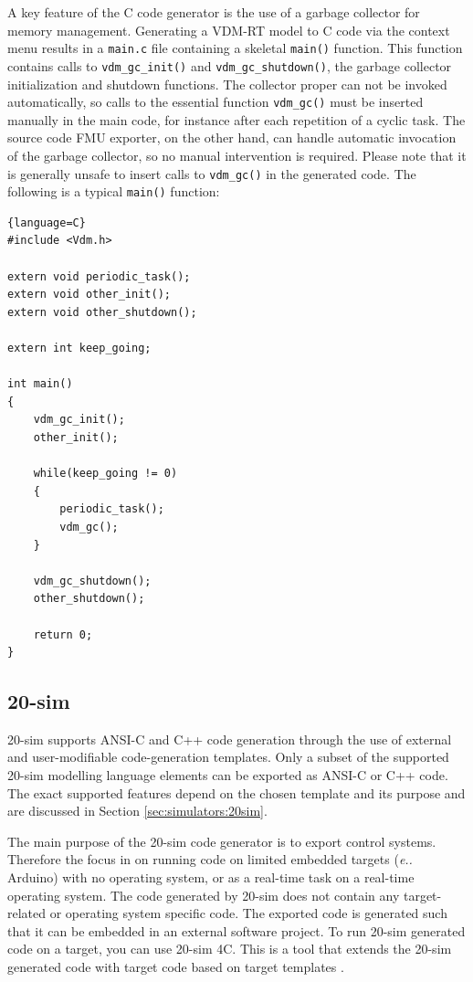 A key feature of the C code generator is the use of a garbage collector for memory management.
%
Generating a VDM-RT model to C code via the context menu results in a \texttt{main.c} file containing a skeletal \texttt{main()} function.
%
This function contains calls to \texttt{vdm\_gc\_init()} and \texttt{vdm\_gc\_shutdown()}, the garbage collector initialization and shutdown functions.
%
The collector proper can not be invoked automatically, so calls to the essential function \texttt{vdm\_gc()} must be inserted manually in the main code, for instance after each repetition of a cyclic task.
%
The source code FMU exporter, on the other hand, can handle automatic invocation of the garbage collector, so no manual intervention is required.
%
Please note that it is generally unsafe to insert calls to \texttt{vdm\_gc()} in the generated code.
%
The following is a typical \texttt{main()} function:
%
%
%
\begin{lstlisting}{language=C}
#include <Vdm.h>

extern void periodic_task();
extern void other_init();
extern void other_shutdown();

extern int keep_going;

int main()
{
	vdm_gc_init();
	other_init();
	
	while(keep_going != 0)
	{
		periodic_task();
		vdm_gc();
	}
	
	vdm_gc_shutdown();
	other_shutdown();
	
	return 0;
}
\end{lstlisting}
%
%
%
\subsection{20-sim}\label{ch:codegen:20-sim}
{20-sim} supports ANSI-C and C++ code generation through the use of external and user-modifiable code-generation templates.
%
Only a subset of the supported {20-sim} modelling language elements can be exported as ANSI-C or C++ code.
The exact supported features depend on the chosen template and its purpose and are discussed in Section \ref{sec:simulators:20sim}.

The main purpose of the {20-sim} code generator is to export control systems.
Therefore the focus in on running code on limited embedded targets (\emph{e.\@g.\@} Arduino) with no operating system, or as a real-time task on a real-time operating system.
%
The code generated by {20-sim} does not contain any target-related or operating system specific code.
The exported code is generated such that it can be embedded in an external software project.
To run {20-sim} generated code on a target, you can use {20-sim 4C}.
This is a tool that extends the {20-sim} generated code with target code based on target templates \cite{20sim4C}. 

